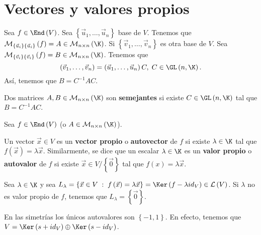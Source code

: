 \section{Vectores y valores propios}
Sea $\displaystyle f\in\End\left(V\right) $. Sea $\displaystyle \left\{ \vec{u}_{1}, \ldots, \vec{u}_{n}\right\}  $ base de $\displaystyle V $. Tenemos que $\displaystyle \mathcal{M}_{ \left\{ \vec{u}_{i}\right\} \left\{ \vec{u}_{i}\right\} }\left(f\right) = A \in \mathcal{M}_{n \times n}\left(\K\right) $. Si $\displaystyle \left\{ \vec{v}_{1}, \ldots, \vec{v}_{n}\right\}  $ es otra base de $\displaystyle V $. Sea $\displaystyle \mathcal{M}_{ \left\{ \vec{v}_{i}\right\} \left\{ \vec{v}_{i}\right\} }\left(f\right) = B \in \mathcal{M}_{n \times n}\left(\K\right) $. 
Tenemos que
\[ \left(\vec{v}_{1}, \ldots, \vec{v}_{n}\right) = \left(\vec{u}_{1}, \ldots, \vec{u}_{n}\right) C, \; C \in \GL\left(n,\K\right) .\]
Así, tenemos que $\displaystyle B = C^{-1} A C $.
\begin{fdefinition}[]
	\normalfont Dos matrices $\displaystyle A, B \in \mathcal{M}_{n \times n}\left(\K\right) $ son \textbf{semejantes} si existe $\displaystyle C \in \GL\left(n, \K\right) $ tal que $\displaystyle B = C^{-1}AC $.
\end{fdefinition}
Sea $\displaystyle f \in \End\left(V\right) $ (o $\displaystyle A \in \mathcal{M}_{n \times n}\left(\K\right) $).
\begin{fdefinition}[]
	\normalfont Un vector $\displaystyle \vec{x} \in V $ es un \textbf{vector propio} o \textbf{autovector} de $\displaystyle f $ si existe $\displaystyle \lambda \in \K $ tal que $\displaystyle f\left(\vec{x}\right) = \lambda \vec{x} $. Similarmente, se dice que un escalar $\displaystyle \lambda \in \K $ es un \textbf{valor propio} o \textbf{autovalor} de $\displaystyle f $ si existe $\displaystyle \vec{x} \in V/ \left\{ \vec{0}\right\}  $ tal que $\displaystyle f\left(x\right) = \lambda \vec{x} $.
\end{fdefinition}
Sea $\displaystyle \lambda \in \K $ y sea $\displaystyle L_{\lambda } = \left\{ \vec{x} \in V \; : \; f\left(\vec{x}\right) = \lambda\vec{x}\right\} = \Ker\left(f - \lambda id _{V}\right) \in \mathcal{L}\left(V\right)$. Si $\displaystyle \lambda  $ no es valor propio de $\displaystyle f $, tenemos que $\displaystyle L_{\lambda } = \left\{ \vec{0}\right\}  $.
\begin{observation}
	\normalfont En las simetrías los únicos autovalores son $\displaystyle \left\{ -1, 1\right\}  $. En efecto, tenemos que $\displaystyle V = \Ker\left(s + id _{V}\right) \oplus \Ker\left(s - id _{V}\right) $.
\end{observation}
